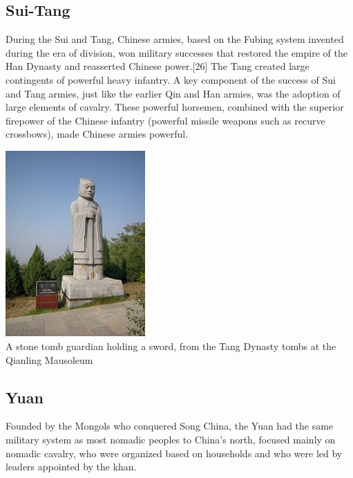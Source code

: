 \documentclass[compress]{beamer}
\begin{document}
\begin{frame}
\subsection{Sui-Tang}
During the Sui and Tang, Chinese armies, based on the Fubing system invented during the era of division, won military successes that restored the empire of the Han Dynasty and reasserted Chinese power.[26] The Tang created large contingents of powerful heavy infantry. A key component of the success of Sui and Tang armies, just like the earlier Qin and Han armies, was the adoption of large elements of cavalry. These powerful horsemen, combined with the superior firepower of the Chinese infantry (powerful missile weapons such as recurve crossbows), made Chinese armies powerful.
\end{frame}

\begin{frame}
\begin{center}
\includegraphics[width = 0.40\textwidth]{military-en/h.JPG} \\
A stone tomb guardian holding a sword, from the Tang Dynasty tombs at the Qianling Mausoleum
\end{center}
\end{frame}

\begin{frame}
\subsection{Yuan}
Founded by the Mongols who conquered Song China, the Yuan had the same military system as most nomadic peoples to China's north, focused mainly on nomadic cavalry, who were organized based on households and who were led by leaders appointed by the khan.
\end{frame}
\end{document}
